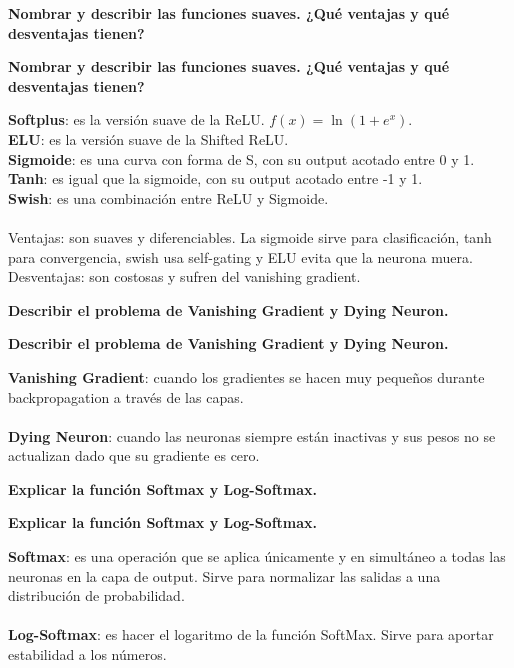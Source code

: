 \documentclass[10pt]{memoir}
\begin{document}
\clearpage
\begin{center}
	\textbf{\Large Nombrar y describir las funciones suaves. ¿Qué ventajas y qué desventajas tienen?}
\end{center}

\clearpage
\begin{center}
	\textbf{\Large Nombrar y describir las funciones suaves. ¿Qué ventajas y qué desventajas tienen?}
\end{center}
\noindent \textbf{Softplus}: es la versión suave de la ReLU. \(f(x) = \ln(1+e^{x})\). \\
\textbf{ELU}: es la versión suave de la Shifted ReLU. \\
\textbf{Sigmoide}: es una curva con forma de S, con su output acotado entre 0 y 1. \\
\textbf{Tanh}: es igual que la sigmoide, con su output acotado entre -1 y 1. \\
\textbf{Swish}: es una combinación entre ReLU y Sigmoide. \\
\\
\noindent Ventajas: son suaves y diferenciables. La sigmoide sirve para clasificación, tanh para convergencia, swish usa self-gating y ELU evita que la neurona muera. \\
Desventajas: son costosas y sufren del vanishing gradient.

\clearpage
\begin{center}
	\textbf{\Large Describir el problema de Vanishing Gradient y Dying Neuron.}
\end{center}

\clearpage
\begin{center}
	\textbf{\Large Describir el problema de Vanishing Gradient y Dying Neuron.}
\end{center}
\noindent \textbf{Vanishing Gradient}: cuando los gradientes se hacen muy pequeños durante backpropagation a través de las capas. \\
\\
\noindent \textbf{Dying Neuron}: cuando las neuronas siempre están inactivas y sus pesos no se actualizan dado que su gradiente es cero.

\clearpage
\begin{center}
	\textbf{\Large Explicar la función Softmax y Log-Softmax.}
\end{center}

\clearpage
\begin{center}
	\textbf{\Large Explicar la función Softmax y Log-Softmax.} \\
\end{center}
\noindent \textbf{Softmax}: es una operación que se aplica únicamente y en simultáneo a todas las neuronas en la capa de output. Sirve para normalizar las salidas a una distribución de probabilidad. \\
\\
\noindent \textbf{Log-Softmax}: es hacer el logaritmo de la función SoftMax. Sirve para aportar estabilidad a los números.
\end{document}
